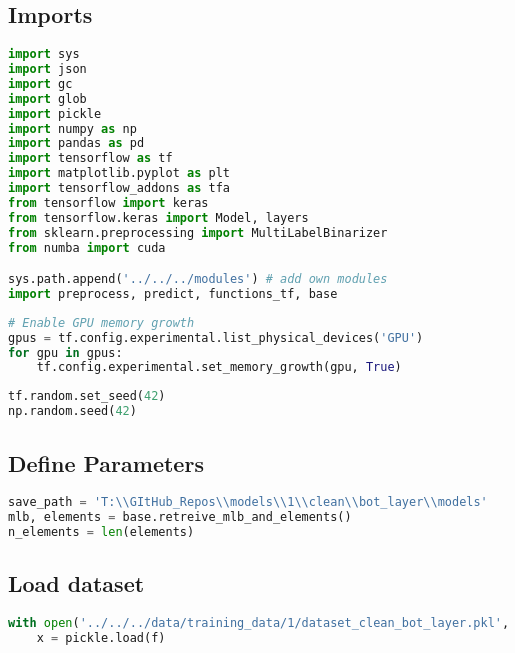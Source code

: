 \hypertarget{imports}{%
\subsection{Imports}\label{imports}}

\begin{lstlisting}[language=Python]
import sys
import json
import gc
import glob
import pickle
import numpy as np
import pandas as pd
import tensorflow as tf
import matplotlib.pyplot as plt
import tensorflow_addons as tfa
from tensorflow import keras
from tensorflow.keras import Model, layers
from sklearn.preprocessing import MultiLabelBinarizer
from numba import cuda

sys.path.append('../../../modules') # add own modules
import preprocess, predict, functions_tf, base
\end{lstlisting}

\begin{lstlisting}[language=Python]
# Enable GPU memory growth
gpus = tf.config.experimental.list_physical_devices('GPU')
for gpu in gpus:
    tf.config.experimental.set_memory_growth(gpu, True)
\end{lstlisting}

\begin{lstlisting}[language=Python]
tf.random.set_seed(42)
np.random.seed(42)
\end{lstlisting}

\hypertarget{define-parameters}{%
\subsection{Define Parameters}\label{define-parameters}}

\begin{lstlisting}[language=Python]
save_path = 'T:\\GItHub_Repos\\models\\1\\clean\\bot_layer\\models'
mlb, elements = base.retreive_mlb_and_elements()
n_elements = len(elements)
\end{lstlisting}

\hypertarget{load-dataset}{%
\subsection{Load dataset}\label{load-dataset}}

\begin{lstlisting}[language=Python]
with open('../../../data/training_data/1/dataset_clean_bot_layer.pkl', 'rb') as f:
    x = pickle.load(f)
\end{lstlisting}

